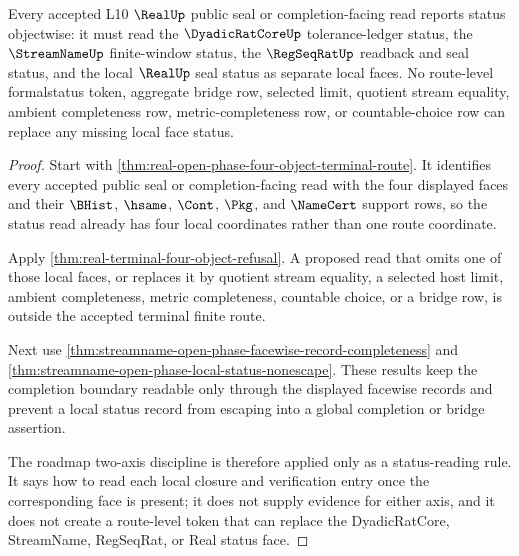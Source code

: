 \begin{theorem}
\label{thm:real-open-phase-objectwise-status-readback}
Every accepted L10 $\RealUp$ public seal or completion-facing read reports status objectwise: it must read the $\DyadicRatCoreUp$ tolerance-ledger status, the $\StreamNameUp$ finite-window status, the $\RegSeqRatUp$ readback and seal status, and the local $\RealUp$ seal status as separate local faces. No route-level formalstatus token, aggregate bridge row, selected limit, quotient stream equality, ambient completeness row, metric-completeness row, or countable-choice row can replace any missing local face status.
\end{theorem}
\begin{proof}
Start with \autoref{thm:real-open-phase-four-object-terminal-route}. It identifies every accepted public seal or completion-facing read with the four displayed faces and their $\BHist$, $\hsame$, $\Cont$, $\Pkg$, and $\NameCert$ support rows, so the status read already has four local coordinates rather than one route coordinate.

Apply \autoref{thm:real-terminal-four-object-refusal}. A proposed read that omits one of those local faces, or replaces it by quotient stream equality, a selected host limit, ambient completeness, metric completeness, countable choice, or a bridge row, is outside the accepted terminal finite route.

Next use \autoref{thm:streamname-open-phase-facewise-record-completeness} and \autoref{thm:streamname-open-phase-local-status-nonescape}. These results keep the completion boundary readable only through the displayed facewise records and prevent a local status record from escaping into a global completion or bridge assertion.

The roadmap two-axis discipline is therefore applied only as a status-reading rule. It says how to read each local closure and verification entry once the corresponding face is present; it does not supply evidence for either axis, and it does not create a route-level token that can replace the DyadicRatCore, StreamName, RegSeqRat, or Real status face.
\end{proof}

